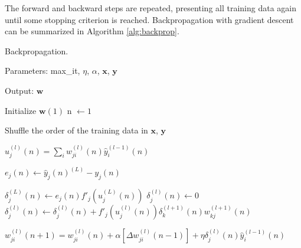 The forward and backward steps are repeated, presenting all training data again until some stopping criterion is reached. Backpropagation with gradient descent can be summarized in Algorithm \ref{alg:backprop}.


\begin{algorithm}[h!]
    \caption{Backpropagation. \label{alg:backprop}}
    
    Parameters: max\_it, $\eta$, $\alpha$, $\mathbf{x}$, $\mathbf{y}$
    
    Output: $\mathbf{w}$
    
    \begin{algorithmic}[1] 
        \STATE Initialize $\mathbf{w}(1)$
        \STATE n $\leftarrow 1$

		\STATE Shuffle the order of the training data in $\mathbf{x}$, $\mathbf{y}$

                
                        \STATE $u_j^{(l)}(n) = \sum_i w_{ji}^{(l)}(n) \hat{y}_i^{(l-1)}(n)$ 
                    \ENDFOR

					
                \ENDFOR
            
            \ENDFOR
            

                    \STATE $e_j (n) \leftarrow \hat{y}_j(n)^{(L)} - y_j (n)$ 
            \ENDFOR


                        \STATE $ \delta_j^{(L)} (n) \leftarrow e_j(n) {f}'_j (u_j^{(L)}(n)) $ 
                    \ELSE
                    	  \STATE $\delta_j^{(l)} (n) \leftarrow 0$
                            \STATE $ \delta_j^{(l)} (n) \leftarrow \delta_j^{(l)} (n) + {f}'_j (u_j^{(l)}(n)) \delta_k^{(l+1)} (n) w_{kj}^{(l+1)}(n) $ 
                        \ENDFOR
                    \ENDIF

                        \STATE $w_{ji}^{(l)} (n+1) = w_{ji}^{(l)}(n) + \alpha[\Delta w_{ji}^{(l)}(n-1)] + \eta \delta_j^{(l)}(n) \hat{y}_i^{(l-1)} (n)$ 
                    \ENDFOR
                \ENDFOR

            \ENDFOR

		\ENDFOR
        \ENDWHILE
    \end{algorithmic}
\end{algorithm}

